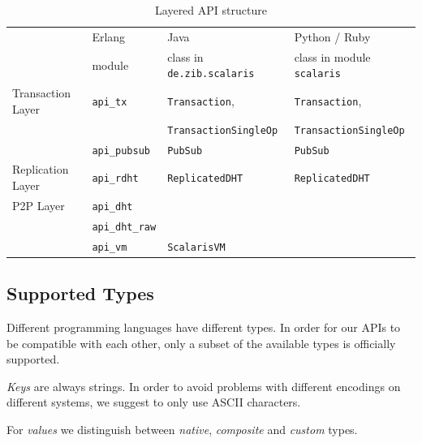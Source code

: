 \documentclass[a4paper]{scrreprt}
\newcommand{\code}[1]{\lstinline[basicstyle=\ttfamily]!#1!}
\begin{document}
\begin{table}
  \centering
    \begin{tabular}{p{4cm}lll}
    \toprule
                      & Erlang                 & Java                         & Python / Ruby              \\
                      & \footnotesize{module}  & \footnotesize{class in \code{de.zib.scalaris}}%
                                                                              & \footnotesize{class in module \code{scalaris}} \\
    \midrule
    Transaction Layer & \code{api_tx}          & \code{Transaction},          & \code{Transaction},        \\
                      &                        & \code{TransactionSingleOp}   & \code{TransactionSingleOp} \\
                      & \code{api_pubsub}      & \code{PubSub}                & \code{PubSub}              \\
    \cmidrule(lr){1-4}
    Replication Layer & \code{api_rdht}        & \code{ReplicatedDHT}         & \code{ReplicatedDHT}       \\
    \cmidrule(lr){1-4}
    P2P Layer         & \code{api_dht}         &                              &                            \\
                      & \code{api_dht_raw}     &                              &                            \\
                      & \code{api_vm}          & \code{ScalarisVM}            &                            \\
    \bottomrule
    \end{tabular}
    \caption{Layered API structure}
    \label{api.layers}
\end{table}

\subsection{Supported Types}

Different programming languages have different types. In order for our APIs
to be compatible with each other, only a subset of the available types is
officially supported.

\emph{Keys} are always strings. In order to avoid problems with different
encodings on different systems, we suggest to only use ASCII characters.

For \emph{values} we distinguish between \emph{native}, \emph{composite}
and \emph{custom} types.
\end{document}
